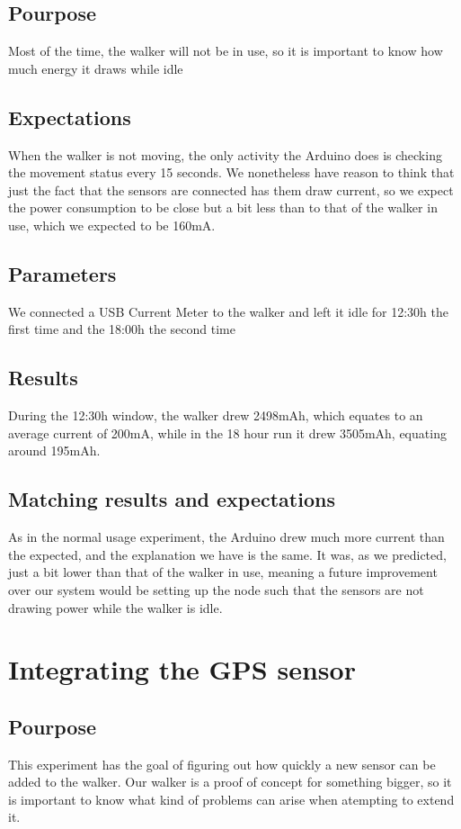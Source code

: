 	\subsection{Pourpose}
		Most of the time, the walker will not be in use, so it is important to know how much energy it draws while idle
	\subsection{Expectations}
		When the walker is not moving, the only activity the Arduino does is checking the movement status every 15 seconds. We nonetheless have reason to think that just the fact that the sensors are connected has them draw current, so we expect the power consumption to be close but a bit less than to that of the walker in use, which we expected to be 160mA.
	\subsection{Parameters}
		We connected a USB Current Meter to the walker and left it idle for 12:30h the first time and the 18:00h the second time
	\subsection{Results}
		During the 12:30h window, the walker drew 2498mAh, which equates to an average current of 200mA, while in the 18 hour run it drew 3505mAh, equating around 195mAh.
	\subsection{Matching results and expectations}
		As in the normal usage experiment, the Arduino drew much more current than the expected, and the explanation we have is the same. It was, as we predicted, just a bit lower than that of the walker in use, meaning a future improvement over our system would be setting up the node such that the sensors are not drawing power while the walker is idle.

\section{Integrating the GPS sensor}
	\subsection{Pourpose}
	This experiment has the goal of figuring out how quickly a new sensor can be added to the walker. Our walker is a proof of concept for something bigger, so it is important to know what kind of problems can arise when atempting to extend it.

